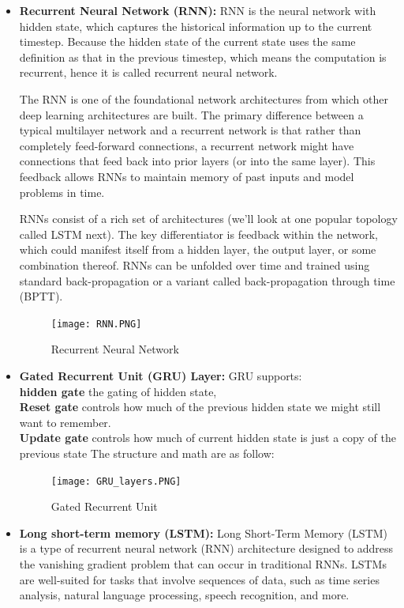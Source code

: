 \begin{itemize}
\begin{itemize}
     \item \textbf{Recurrent Neural Network (RNN): } RNN is the neural network with hidden state, which captures the historical information up to the current timestep. Because the hidden state of the current state uses the same definition as that in the previous timestep, which means the computation is recurrent, hence it is called recurrent neural network.

     The RNN is one of the foundational network architectures from which other deep learning architectures are built. The primary difference between a typical multilayer network and a recurrent network is that rather than completely feed-forward connections, a recurrent network might have connections that feed back into prior layers (or into the same layer). This feedback allows RNNs to maintain memory of past inputs and model problems in time.

    RNNs consist of a rich set of architectures (we'll look at one popular topology called LSTM next). The key differentiator is feedback within the network, which could manifest itself from a hidden layer, the output layer, or some combination thereof.
    RNNs can be unfolded over time and trained using standard back-propagation or a variant called back-propagation through time (BPTT).  \cite{sherstinsky2020fundamentals}\\
    \begin{figure}[H]
        \centering\texttt{[image: RNN.PNG]}
        \caption{Recurrent Neural Network}
    \end{figure}
    \item \textbf{Gated Recurrent Unit (GRU) Layer: } GRU supports: \\
    \textbf{hidden gate} the gating of hidden state, \\
    \textbf{Reset gate} controls how much of the previous hidden state we might still want to remember.\\
    \textbf{Update gate} controls how much of current hidden state is just a copy of the previous state
    The structure and math are as follow:
    \begin{figure}[H]
        \centering\texttt{[image: GRU\_layers.PNG]}
        \caption{Gated Recurrent Unit}
    \end{figure}
    \item \textbf{Long short-term memory (LSTM): } Long Short-Term Memory (LSTM) is a type of recurrent neural network (RNN) architecture designed to address the vanishing gradient problem that can occur in traditional RNNs. LSTMs are well-suited for tasks that involve sequences of data, such as time series analysis, natural language processing, speech recognition, and more.


\end{itemize}
\end{itemize}
